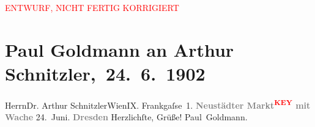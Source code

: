 
\begin{center}
            \textcolor{red}{ENTWURF, NICHT FERTIG KORRIGIERT}
                      \end{center}
            
         \renewcommand{\erwaehnteOrte}{Orte: Dresden, Frankgasse, Wien}
         \renewcommand{\erwaehnteWerke}{}
               \section[ Paul Goldmann an Arthur Schnitzler, 24. 6. 1902]{ Paul Goldmann an Arthur Schnitzler, 24. 6. 1902}\nopagebreak{}\rehead{ }\begin{ledgroupsized}[t]{13cm}\normalsize\beginnumbering \toendnotes[C]{\smallbreak\pagebreak[2]} 
\pstart{}{\pb}Herrn\pend{}\pstart{}Dr. Arthur Schnitzler\pend{}\pstart{}Wien\pend{}\pstart{}IX. Frankgaſse 1.\pend{}{\bigskip}\pstart
           \noindent{}{\pb}\textcolor{gray}{\textbf{Neustädter Markt\textcolor{red}{\textsuperscript{\textbf{KEY}}} mit Wache}}{ }24. Juni. \textcolor{gray}{\textbf{Dresden}}\pend
           \pstart
           Herzlichſte, Grüße! \spacefill\mbox{Paul Goldmann.}\pend
           
         
         \endnumbering{}\end{ledgroupsized}\begin{anhang}\end{anhang}\newcommand{\dateiname}{L03212}\newcommand{\titel}{Paul Goldmann an Arthur Schnitzler, 24. 6. 1902}\newcommand{\editorInnen}{Martin Anton Müller und Laura Untner}
      